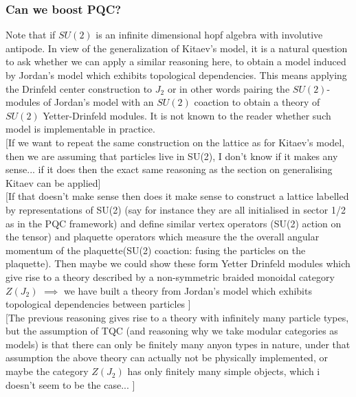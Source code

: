 \documentclass{article}
\begin{document}
\subsubsection{Can we boost PQC?}
Note that if $SU(2)$ is an infinite dimensional hopf algebra with involutive antipode. In view of the generalization of Kitaev's model, it is a natural question to ask whether we can apply a similar reasoning here, to obtain a model induced by Jordan's model which exhibits topological dependencies. This means applying the Drinfeld center construction to $J_2$ or in other words pairing the $SU(2)$-modules of Jordan's model with an $SU(2)$ coaction to obtain a theory of $SU(2)$ Yetter-Drinfeld modules. It is not known to the reader whether such model is implementable in practice. \\
{\color{blue} [If we want to repeat the same construction on the lattice as for Kitaev's model, then we are assuming that particles live in SU(2), I don't know if it makes any sense... if it does then the exact same reasoning as the section on generalising Kitaev can be applied]}\\
{\color{blue} [If that doesn't make sense then does it make sense to construct a lattice labelled by representations of SU(2) (say for instance they are all initialised in sector 1/2 as in the PQC framework) and define similar vertex operators (SU(2) action on the tensor) and plaquette operators which measure the the overall angular momentum of the plaquette(SU(2) coaction: fusing the particles on the plaquette). Then maybe we could show these form Yetter Drinfeld modules which give rise to a theory described by a non-symmetric braided monoidal category $Z(J_2)$ $\implies$ we have built a theory from Jordan's model which exhibits topological dependencies between particles ]}\\
{\color{blue} [The previous reasoning gives rise to a theory with infinitely many particle types, but the assumption of TQC (and reasoning why we take modular categories as models) is that there can only be finitely many anyon types in nature, under that assumption the above theory can actually not be physically implemented, or maybe the category $Z(J_2)$ has only finitely many simple objects, which i doesn't seem to be the case... ]}
\end{document}
